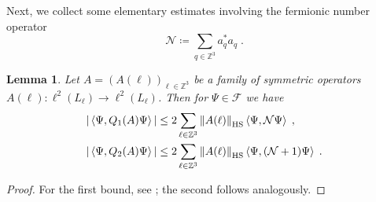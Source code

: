 \documentclass[12pt,a4paper]{article}
\numberwithin{equation}{section}
\newcommand{\cF}{\mathcal{F}}
\newcommand{\cN}{\mathcal{N}}
\newcommand{\1}{\mathbb{I}}
\newcommand{\HS}{\mathrm{HS}}
\newcommand{\Zstar}{\mathbb{Z}^3} %
\newcommand{\Z}{\mathbb{Z}}
\newcommand{\NN}{\mathcal{N}}
\newcommand{\half}{\frac{1}{2}}
\newcommand{\eva}[1]{\left\langle #1 \right\rangle}
\theoremstyle{plain}
\newtheorem{lemma}[theorem]{Lemma}
\theoremstyle{definition}
\theoremstyle{remark}
\theoremstyle{plain}
\theoremstyle{definition}
\theoremstyle{remark}
\begin{document}
Next, we collect some elementary estimates involving the fermionic number operator
\begin{equation} \label{eq:cN}
	\cN \coloneq \sum_{q \in \Z^3} a_q^* a_q \;.
\end{equation}
%


\begin{lemma}\label{lem:estQ2}
Let $A = (A(\ell))_{\ell \in \Zstar}$ be a family of symmetric operators $ A(\ell) : \ell^2(L_\ell) \to \ell^2(L_\ell) $. Then for $ \Psi \in \cF $ we have
\begin{equation} \label{eq:Qest}
\begin{aligned}
	|\eva{\Psi,Q_1(A)\Psi}|
	&\leq 2\sum_{\ell\in \Zstar}\norm{A(\ell)}_{\HS}\eva{\Psi,\mathcal{N} \Psi} \;, \\
	|\eva{\Psi,Q_2(A)\Psi}|
	&\leq 2\sum_{\ell\in \Zstar}\norm{A(\ell)}_{\HS}\eva{\Psi,(\mathcal{N}+1) \Psi} \;.
\end{aligned}
\end{equation}
\end{lemma}

\begin{proof}
For the first bound, see \cite[Prop.~4.7]{CHN21}; the second follows analogously.
\end{proof}
\end{document}

